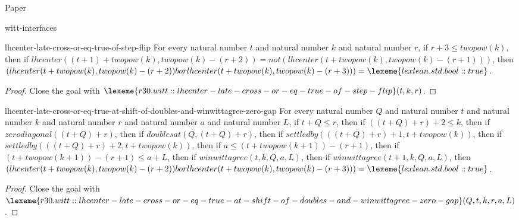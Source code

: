 \begin{lexlean}{Paper}
\begin{section}{witt-interfaces}
  \begin{theorem}{lhcenter-late-cross-or-eq-true-of-step-flip}
  For every natural number \(t\) and natural number \(k\) and natural number \(r\), if \(r + 3 ≤ twopow(k)\), then if \(lhcenter((t + 1) + twopow(k), twopow(k) - (r + 2)) = not(lhcenter(t + twopow(k), twopow(k) - (r + 1)))\), then \((lhcenter(t + twopow(k), twopow(k) - (r + 2)) bor lhcenter(t + twopow(k), twopow(k) - (r + 3))) = \lexeme{lexlean.std.bool::true}\).
  \begin{proof}
  Close the goal with \(\lexeme{r30.witt::lhcenter-late-cross-or-eq-true-of-step-flip}(t, k, r)\).
  \end{proof}
  \end{theorem}

  \begin{theorem}{lhcenter-late-cross-or-eq-true-at-shift-of-doubles-and-winwittagree-zero-gap}
  For every natural number \(Q\) and natural number \(t\) and natural number \(k\) and natural number \(r\) and natural number \(a\) and natural number \(L\), if \(t + Q ≤ r\), then if \(((t + Q) + r) + 2 ≤ k\), then if \(zerodiagonal((t + Q) + r)\), then if \(doublesat(Q, (t + Q) + r)\), then if \(settledby(((t + Q) + r) + 1, t + twopow(k))\), then if \(settledby(((t + Q) + r) + 2, t + twopow(k))\), then if \(a ≤ (t + twopow(k + 1)) - (r + 1)\), then if \((t + twopow(k + 1)) - (r + 1) ≤ a + L\), then if \(winwittagree(t, k, Q, a, L)\), then if \(winwittagree(t + 1, k, Q, a, L)\), then \((lhcenter(t + twopow(k), twopow(k) - (r + 2)) bor lhcenter(t + twopow(k), twopow(k) - (r + 3))) = \lexeme{lexlean.std.bool::true}\).
  \begin{proof}
  Close the goal with \(\lexeme{r30.witt::lhcenter-late-cross-or-eq-true-at-shift-of-doubles-and-winwittagree-zero-gap}(Q, t, k, r, a, L)\).
  \end{proof}
  \end{theorem}


\end{section}
\end{lexlean}
